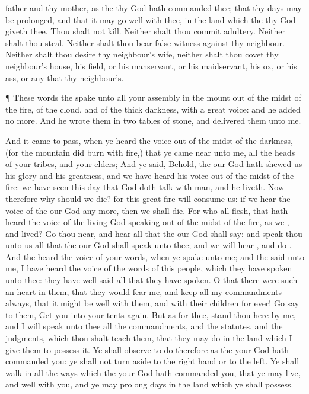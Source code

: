 {father and thy
mother, as the
{} thy
God hath
commanded thee; that thy
days may be
prolonged, and that it may go
well with thee, in the
land which the
{} thy
God
giveth thee.
Thou shalt not
kill.
Neither shalt thou commit
adultery.
Neither shalt thou
steal.
Neither shalt thou
bear
false
witness against thy
neighbour.
Neither shalt thou
desire thy
neighbour’s
wife, neither shalt thou
covet thy
neighbour’s
house, his
field, or his
manservant, or his
maidservant, his
ox, or his
ass, or any
{} that
{} thy
neighbour’s.
\par }{\PP {}¶ These
words the
{}
spake unto all your
assembly in the
mount out of the
midst of the
fire, of the
cloud, and of the thick
darkness, with a
great
voice: and he added no
more. And he
wrote them in
two
tables of
stone, and
delivered them unto me.
\par }{\PP {}And it came to pass, when ye
heard the
voice out of the
midst of the
darkness, (for the
mountain did
burn with
fire,) that ye came
near unto me,
{} all the
heads of your
tribes, and your
elders;
And ye
said, Behold, the
{} our
God hath
shewed us his
glory and his
greatness, and we have
heard his
voice out of the
midst of the
fire: we have
seen this
day that
God doth
talk with
man, and he
liveth.
Now therefore why should we
die? for this
great
fire will
consume us: if we
hear the
voice of the
{} our
God any
more, then we shall
die.
For who
{} all
flesh, that hath
heard the
voice of the
living
God
speaking out of the
midst of the
fire, as we
{}, and
lived?
Go thou
near, and
hear all that the
{} our
God shall
say: and
speak thou unto us all that the
{} our
God shall
speak unto thee; and we will
hear
{}, and
do
{}.
And the
{}
heard the
voice of your
words, when ye
spake unto me; and the
{}
said unto me, I have
heard the
voice of the
words of this
people, which they have
spoken unto thee: they have
well said all that they have
spoken.
O that there were
such
an
heart in
them, that they would
fear me, and
keep all my
commandments
always, that it might be
well with them, and with their
children for
ever!
Go
say to them,
Get you into your
tents
again.
But as for thee,
stand thou here by
me, and I will
speak unto thee all the
commandments, and the
statutes, and the
judgments, which thou shalt
teach them, that they may
do
{} in the
land which I
give them to
possess it.
Ye shall
observe to
do therefore as the
{} your
God hath
commanded you: ye shall not turn
aside to the right
hand or to the
left.
Ye shall
walk in all the
ways which the
{} your
God hath
commanded you, that ye may
live, and
{}
well with you, and
{} ye may
prolong
{}
days in the
land which ye shall
possess.

}
